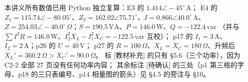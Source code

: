 \documentclass[11pt]{ctexart}
\begin{document}
\flowerrule

{\small\color{inkgray}
本讲义所有数值已用 Python 独立复算：E3 的 $1.414\angle-45^\circ\,\mathrm{A}$；
E4 的 $Z_1=115.74\angle-80.05^\circ$、$Z_2=162.02\angle75.71^\circ$、$\dot I=0.866\angle40.0^\circ\,\mathrm{A}$、
$Z=254.03\angle-40.0^\circ\,\Omega$；$S=190.5\,\mathrm{VA}$、$P=146.0\,\mathrm{W}$、$Q=-122.4\,\mathrm{var}$
（并与 $\sum I^2R=146.0\,\mathrm{W}$、$I_2^2X_L-I_1^2X_C=-122.5\,\mathrm{var}$ 互校）；
p17 的 $\dot I_1=3\,\mathrm{A}$、$\dot I_2=2\,\mathrm{A}$；p26 的 $U=40\,\mathrm{V}$；
p27 的 $R=100\,\Omega$、$X_L=X_C=180\,\Omega$、升频后 $X_L'=360.2\,\Omega>X_C'=90.0\,\Omega$。
标 [教材补充] 的只有 §5.6（三个功率），因为 C2-2 全部 27 页没有任何功率内容；
其余标注 [待确认] 的三处（p1 第三格的字母、p18 的三只表编号、p14 相量图的箭头）见 §4.5 的旁注与 §10。}
\end{document}
